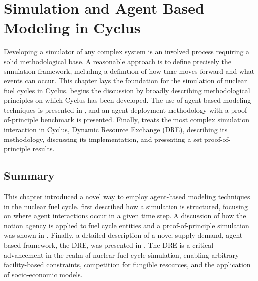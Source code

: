 \chapter{Simulation and Agent Based Modeling in Cyclus}\label{ch:abm}

Developing a simulator of any complex system is an involved process requiring a
solid methodological base. A reasonable approach is to define precisely the
simulation framework, including a definition of how time moves forward and what
events can occur. This chapter lays the foundation for the simulation of nuclear
fuel cycles in Cyclus.  begins the discussion by broadly
describing methodological principles on which Cyclus has been developed. The use
of agent-based modeling techniques is presented in , and an
agent deployment methodology with a proof-of-principle benchmark is
presented. Finally,  treats the most complex simulation
interaction in Cyclus, Dynamic Resource Exchange (DRE), describing its
methodology, discussing its implementation, and presenting a set
proof-of-principle results.







\section{Summary}

This chapter introduced a novel way to employ agent-based modeling techniques in
the nuclear fuel cycle.  first described how a simulation is
structured, focusing on where agent interactions occur in a given time step. A
discussion of how the notion agency is applied to fuel cycle entities and a
proof-of-principle simulation was shown in . Finally, a detailed
description of a novel supply-demand, agent-based framework, the DRE, was
presented in . The DRE is a critical advancement in the realm of
nuclear fuel cycle simulation, enabling arbitrary facility-based constraints,
competition for fungible resources, and the application of socio-economic models.
